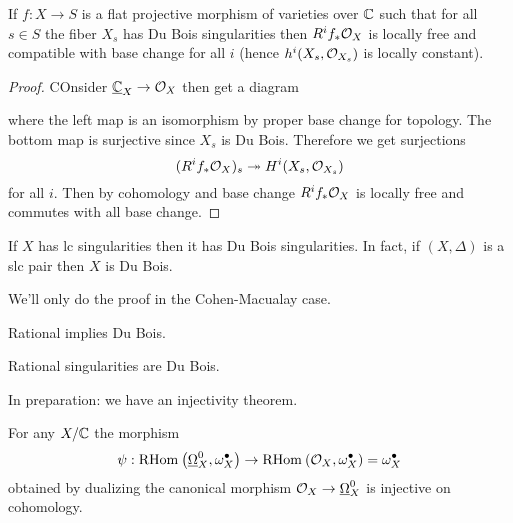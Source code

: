 \documentclass[12pt]{article}
\begin{document}
\begin{prop}[Du Bois]
If $f : X \to S$ is a flat projective morphism of varieties over $\mathbb{C}$ such that for all $s \in S$ the fiber $X_s$ has Du Bois singularities then $R^i f_* \mathcal{O}_{X}$ is locally free and compatible with base change for all $i$ (hence $h^i(X_s, \mathcal{O}_{X_s})$ is locally constant).
\end{prop}

\begin{proof}
COnsider $\underline{\mathbb{C}}_X \to \mathcal{O}_{X}$ then get a diagram
\begin{center}
\end{center}
where the left map is an isomorphism by proper base change for topology. The bottom map is surjective since $X_s$ is Du Bois. Therefore we get surjections
\[ (R^i f_* \mathcal{O}_{X})_s \twoheadrightarrow H^i(X_s, \mathcal{O}_{X_s}) \]
for all $i$. Then by cohomology and base change $R^i f_* \mathcal{O}_{X}$ is locally free and commutes with all base change. 
\end{proof}

\begin{theorem}
If $X$ has lc singularities then it has Du Bois singularities. In fact, if $(X, \Delta)$ is a slc pair then $X$ is Du Bois.
\end{theorem}

We'll only do the proof in the Cohen-Macualay case. 

\begin{conj}[Steenbrink]
Rational implies Du Bois.
\end{conj}

\begin{theorem}
Rational singularities are Du Bois. 
\end{theorem}

In preparation: we have an injectivity theorem.

\begin{theorem}
For any $X / \mathbb{C}$ the morphism
\[ \psi : \mathrm{RHom}_{} \left( \underline{\Omega}_X^0, \omega_X^\bullet \right) \to \mathrm{RHom}_{} \left( \mathcal{O}_{X}, \omega_X^\bullet \right) = \omega_X^\bullet \]
obtained by dualizing the canonical morphism $\mathcal{O}_{X} \to \underline{\Omega}_X^0$ is injective on cohomology. 
\end{theorem}
\end{document}

